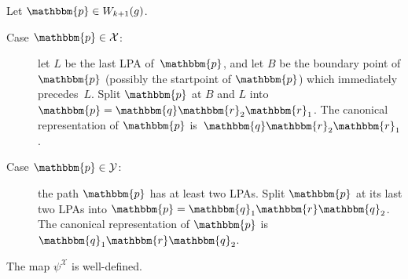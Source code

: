 \documentclass[10pt,a4paper]{amsart}
\newcommand{\lrcornerqed}[0]{}
\begin{document}
\begin{definition}
\label{def:codomain_split}
    Let $\mathbbm{p} \in W_{k+1}(g)$.
    \begin{description}

        \item[Case $\mathbbm{p} \in \mathcal{X}$:]
            let $L$ be the last LPA of~$\mathbbm{p}$, and let $B$ be the boundary point of $\mathbbm{p}$ (possibly the startpoint of $\mathbbm{p}$) which immediately precedes~$L$. 
            Split $\mathbbm{p}$ at $B$ and $L$ into $\mathbbm{p} = \mathbbm{q} \mathbbm{r}_2 \mathbbm{r}_1$. 
            The canonical representation of $\mathbbm{p}$ is~$\mathbbm{q} \mathbbm{r}_2 \mathbbm{r}_1$.

        \item[Case $\mathbbm{p} \in \mathcal{Y}$:]
            the path $\mathbbm{p}$ has at least two LPAs. 
            Split $\mathbbm{p}$ at its 
            last two LPAs
            into $\mathbbm{p} = \mathbbm{q}_1 \mathbbm{r} \mathbbm{q}_2$. 
            The canonical representation of $\mathbbm{p}$ is~$\mathbbm{q}_1 \mathbbm{r} \mathbbm{q}_2$.\lrcornerqed
    \end{description}
\end{definition}

\begin{prop}
\label{rem:codomain_psi_X}
The map $\psi^\mathcal{X}$ is well-defined.
\end{prop}
\end{document}
